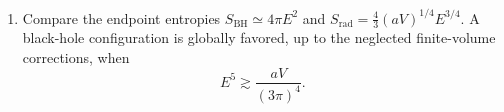 \begin{enumerate}[leftmargin=2.8em,itemsep=1.2em]
\begin{enumerate}[label=\alph*),leftmargin=2em]
\item Compare the endpoint entropies
\(S_{\mathrm{BH}}\simeq4\pi E^2\) and
\(S_{\mathrm{rad}}=\tfrac43(aV)^{1/4}E^{3/4}\).  A black-hole configuration
is globally favored, up to the neglected finite-volume corrections, when
\[
 E^5\gtrsim\frac{aV}{(3\pi)^4}.
\]
\end{enumerate}
\end{enumerate}
